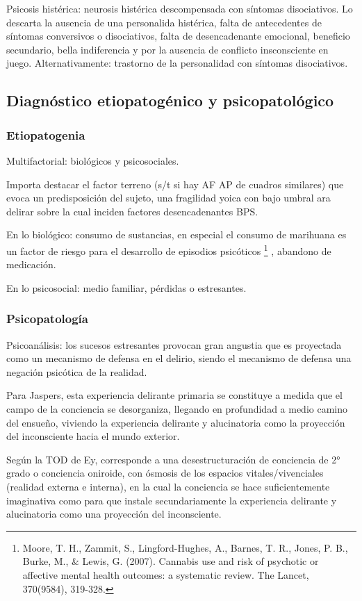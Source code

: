 Psicosis histérica: neurosis histérica descompensada con síntomas disociativos. Lo descarta la ausencia de una personalida histérica, falta de antecedentes de síntomas conversivos o disociativos, falta de desencadenante emocional, beneficio secundario, bella indiferencia y por la ausencia de conflicto insconsciente en juego. Alternativamente: trastorno de la personalidad con síntomas disociativos.

\subsection*{Diagnóstico etiopatogénico y psicopatológico}
\subsubsection*{Etiopatogenia}
Multifactorial: biológicos y psicosociales.

Importa destacar el factor terreno (s/t si hay AF AP de cuadros similares) que evoca un predisposición del sujeto, una fragilidad yoica con bajo umbral ara delirar sobre la cual inciden factores desencadenantes BPS.

En lo biológico: consumo de sustancias, en especial el consumo de marihuana es un factor de riesgo para el desarrollo de episodios psicóticos \footnote{Moore, T. H., Zammit, S., Lingford-Hughes, A., Barnes, T. R., Jones, P. B., Burke, M., \& Lewis, G. (2007). Cannabis use and risk of psychotic or affective mental health outcomes: a systematic review. The Lancet, 370(9584), 319-328.} , abandono de medicación.

En lo psicosocial: medio familiar, pérdidas o estresantes.
\subsubsection*{Psicopatología}
Psicoanálisis: los sucesos estresantes provocan gran angustia que es proyectada como un mecanismo de defensa en el delirio, siendo el mecanismo de defensa una negación psicótica de la realidad.

Para Jaspers, esta experiencia delirante primaria se constituye a medida que el campo de la conciencia se desorganiza, llegando en profundidad a medio camino del ensueño, viviendo la experiencia delirante y alucinatoria como la proyección del inconsciente hacia el mundo exterior.

Según la TOD de Ey, corresponde a una desestructuración de conciencia de 2° grado o conciencia oniroide, con ósmosis de los espacios vitales/vivenciales (realidad externa e interna), en la cual la conciencia se hace suficientemente imaginativa como para que instale secundariamente la experiencia delirante y alucinatoria como una proyección del inconsciente.

